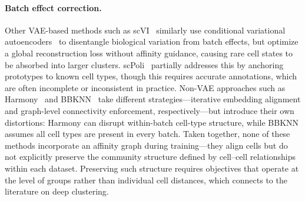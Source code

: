 \paragraph{Batch effect correction.}
Other VAE-based methods such as scVI~\citep{scvi} similarly use conditional variational autoencoders~\citep{cvae} to disentangle biological variation from batch effects, but optimize a global reconstruction loss without affinity guidance, causing rare cell states to be absorbed into larger clusters.
scPoli~\citep{scpoli} partially addresses this by anchoring prototypes to known cell types, though this requires accurate annotations, which are often incomplete or inconsistent in practice.
Non-VAE approaches such as Harmony~\citep{harmony} and BBKNN~\citep{bbknn} take different strategies---iterative embedding alignment and graph-level connectivity enforcement, respectively---but introduce their own distortions: Harmony can disrupt within-batch cell-type structure, while BBKNN assumes all cell types are present in every batch.
Taken together, none of these methods incorporate an affinity graph during training---they align cells but do not explicitly preserve the community structure defined by cell--cell relationships within each dataset.
Preserving such structure requires objectives that operate at the level of groups rather than individual cell distances, which connects to the literature on deep clustering.

